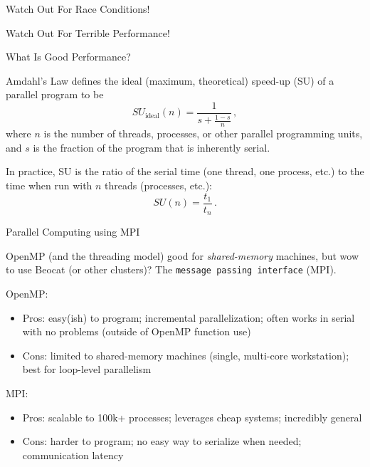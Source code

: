 \documentclass[10pt]{beamer}
\begin{document}
\begin{frame}{Watch Out For Race Conditions!}



\end{frame}


\begin{frame}{Watch Out For Terrible Performance!}



\end{frame}


\begin{frame}[fragile]{What Is Good Performance?}

Amdahl's Law defines the ideal (maximum, theoretical) speed-up (SU) of 
a parallel program to be
\begin{equation*}
 SU_{\text{ideal}}(n) = \frac{1}{s + \frac{1-s}{n}} \, ,
\end{equation*}
where $n$ is the number of threads, processes, or other parallel programming
units, and $s$ is the fraction of the program that is inherently serial.
\vfill 

In practice, SU is the ratio of the serial time (one thread, one process, etc.)
to the time when run with $n$ threads (processes, etc.):
\begin{equation*}
 SU(n) = \frac{t_1}{t_n} \, .
\end{equation*}



\end{frame}

\begin{frame}{Parallel Computing using MPI}

OpenMP (and the threading model) good for {\it shared-memory} machines, but
wow to use Beocat (or other clusters)? The {\tt message passing interface} (MPI).
\vfill 

OpenMP:
\begin{itemize}
 \item Pros: easy(ish) to program; incremental parallelization; often works in serial with no problems (outside of OpenMP function use)
 \item Cons: limited to shared-memory machines (single, multi-core workstation); best for loop-level parallelism
\end{itemize}

MPI:
\begin{itemize}
 \item Pros: scalable to 100k+ processes; leverages cheap systems; incredibly general 
 \item Cons: harder to program; no easy way to serialize when needed; communication latency
\end{itemize}

\end{frame}
\end{document}
